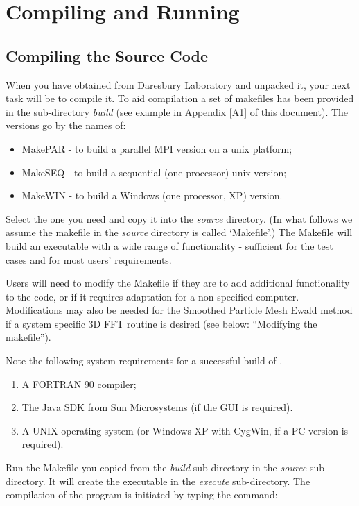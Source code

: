 \section{Compiling and Running \D{}}

\subsection{Compiling the Source Code}
\label{compile}

When you have obtained \D{} from Daresbury Laboratory and unpacked it,
your next task will be to compile it.  To aid compilation a set of
makefiles  has been provided in the
sub-directory {\em build} (see example in Appendix \ref{A1} of this
document). The versions go by the names of: 
\begin{itemize}
\item MakePAR - to build a parallel MPI version on a unix platform;
\item MakeSEQ - to build a sequential (one processor) unix version;
\item MakeWIN - to build a Windows (one processor, XP) version.
\end{itemize}
Select the one you need and copy it into the {\em source} directory. (In
what follows we assume the makefile in the {\em source} directory is called
`Makefile'.) The Makefile will build an executable with a wide
range of functionality - sufficient for the test cases and for most
users' requirements. 

Users will need to modify the Makefile if they are to add additional
functionality to the code, or if it requires adaptation for a non
specified computer. Modifications may also be needed for the Smoothed
Particle Mesh Ewald method if a system specific 3D FFT routine is
desired (see below: ``Modifying the makefile'').

Note the following system requirements for a successful build of \D{}.
\begin{enumerate}
\item A FORTRAN 90 compiler;
\item The Java SDK from Sun Microsystems (if the GUI is required).
\item A UNIX operating system (or Windows XP with CygWin, if a PC 
version is required).
\end{enumerate}

Run the Makefile you copied from the {\em build} sub-directory in the
{\em source} sub-directory. It will create the executable in the {\em
execute} sub-directory. The compilation of the program is initiated by
typing the command:

